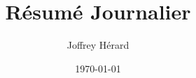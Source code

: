 \documentclass[french]{article}
\begin{document}
\title{Résumé Journalier}
\author{Joffrey Hérard}
\date{\today} 

\maketitle
%
%
\end{document}
